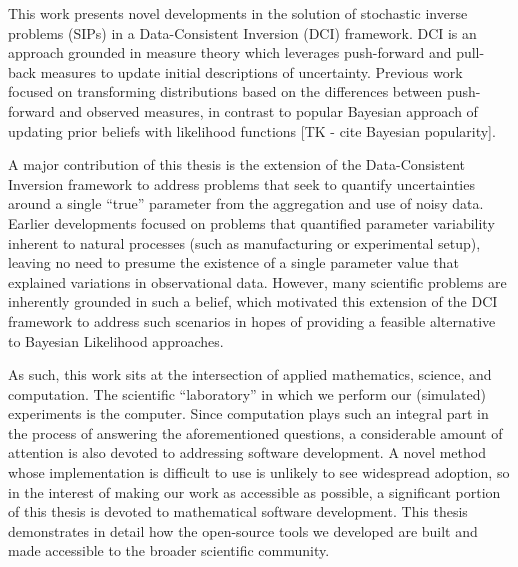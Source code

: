 This work presents novel developments in the solution of stochastic inverse problems (SIPs) in a Data-Consistent Inversion (DCI) framework.
DCI is an approach grounded in measure theory which leverages push-forward and pull-back measures to update initial descriptions of uncertainty.
Previous work focused on transforming distributions based on the differences between push-forward and observed measures, in contrast to popular Bayesian approach of updating prior beliefs with likelihood functions [TK - cite Bayesian popularity].

A major contribution of this thesis is the extension of the Data-Consistent Inversion framework to address problems that seek to quantify uncertainties around a single ``true'' parameter from the aggregation and use of noisy data.
Earlier developments focused on problems that quantified parameter variability inherent to natural processes (such as manufacturing or experimental setup), leaving no need to presume the existence of a single parameter value that explained variations in observational data.
However, many scientific problems are inherently grounded in such a belief, which motivated this extension of the DCI framework to address such scenarios in hopes of providing a feasible alternative to Bayesian Likelihood approaches.

As such, this work sits at the intersection of applied mathematics, science, and computation.
The scientific ``laboratory'' in which we perform our (simulated) experiments is the computer.
Since computation plays such an integral part in the process of answering the aforementioned questions, a considerable amount of attention is also devoted to addressing software development.
A novel method whose implementation is difficult to use is unlikely to see widespread adoption, so in the interest of making our work as accessible as possible, a significant portion of this thesis is devoted to mathematical software development.
This thesis demonstrates in detail how the open-source tools we developed are built and made accessible to the broader scientific community.
